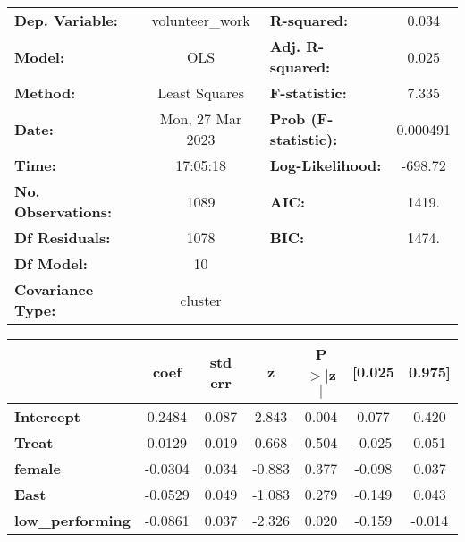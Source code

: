\begin{center}
\begin{tabular}{lclc}
\toprule
\textbf{Dep. Variable:}       & volunteer\_work  & \textbf{  R-squared:         } &     0.034   \\
\textbf{Model:}               &       OLS        & \textbf{  Adj. R-squared:    } &     0.025   \\
\textbf{Method:}              &  Least Squares   & \textbf{  F-statistic:       } &     7.335   \\
\textbf{Date:}                & Mon, 27 Mar 2023 & \textbf{  Prob (F-statistic):} &  0.000491   \\
\textbf{Time:}                &     17:05:18     & \textbf{  Log-Likelihood:    } &   -698.72   \\
\textbf{No. Observations:}    &        1089      & \textbf{  AIC:               } &     1419.   \\
\textbf{Df Residuals:}        &        1078      & \textbf{  BIC:               } &     1474.   \\
\textbf{Df Model:}            &          10      & \textbf{                     } &             \\
\textbf{Covariance Type:}     &     cluster      & \textbf{                     } &             \\
\bottomrule
\end{tabular}
\begin{tabular}{lcccccc}
                              & \textbf{coef} & \textbf{std err} & \textbf{z} & \textbf{P$> |$z$|$} & \textbf{[0.025} & \textbf{0.975]}  \\
\midrule
\textbf{Intercept}            &       0.2484  &        0.087     &     2.843  &         0.004        &        0.077    &        0.420     \\
\textbf{Treat}                &       0.0129  &        0.019     &     0.668  &         0.504        &       -0.025    &        0.051     \\
\textbf{female}               &      -0.0304  &        0.034     &    -0.883  &         0.377        &       -0.098    &        0.037     \\
\textbf{East}                 &      -0.0529  &        0.049     &    -1.083  &         0.279        &       -0.149    &        0.043     \\
\textbf{low\_performing}      &      -0.0861  &        0.037     &    -2.326  &         0.020        &       -0.159    &       -0.014     \\

\end{tabular}
\end{center}
